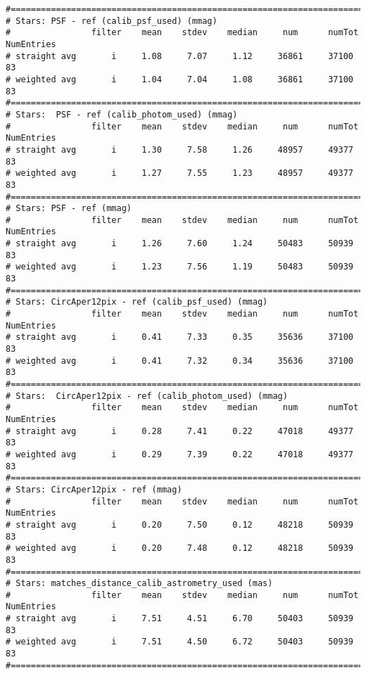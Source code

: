 \begin{verbatim}
#================================================================================
# Stars: PSF - ref (calib_psf_used) (mmag)
#                filter    mean    stdev    median     num      numTot  NumEntries
# straight avg       i     1.08     7.07     1.12     36861     37100        83
# weighted avg       i     1.04     7.04     1.08     36861     37100        83
#================================================================================
# Stars:  PSF - ref (calib_photom_used) (mmag)
#                filter    mean    stdev    median     num      numTot  NumEntries
# straight avg       i     1.30     7.58     1.26     48957     49377        83
# weighted avg       i     1.27     7.55     1.23     48957     49377        83
#================================================================================
# Stars: PSF - ref (mmag)
#                filter    mean    stdev    median     num      numTot  NumEntries
# straight avg       i     1.26     7.60     1.24     50483     50939        83
# weighted avg       i     1.23     7.56     1.19     50483     50939        83
#================================================================================
# Stars: CircAper12pix - ref (calib_psf_used) (mmag)
#                filter    mean    stdev    median     num      numTot  NumEntries
# straight avg       i     0.41     7.33     0.35     35636     37100        83
# weighted avg       i     0.41     7.32     0.34     35636     37100        83
#================================================================================
# Stars:  CircAper12pix - ref (calib_photom_used) (mmag)
#                filter    mean    stdev    median     num      numTot  NumEntries
# straight avg       i     0.28     7.41     0.22     47018     49377        83
# weighted avg       i     0.29     7.39     0.22     47018     49377        83
#================================================================================
# Stars: CircAper12pix - ref (mmag)
#                filter    mean    stdev    median     num      numTot  NumEntries
# straight avg       i     0.20     7.50     0.12     48218     50939        83
# weighted avg       i     0.20     7.48     0.12     48218     50939        83
#================================================================================
# Stars: matches_distance_calib_astrometry_used (mas)
#                filter    mean    stdev    median     num      numTot  NumEntries
# straight avg       i     7.51     4.51     6.70     50403     50939        83
# weighted avg       i     7.51     4.50     6.72     50403     50939        83
#================================================================================

\end{verbatim}
